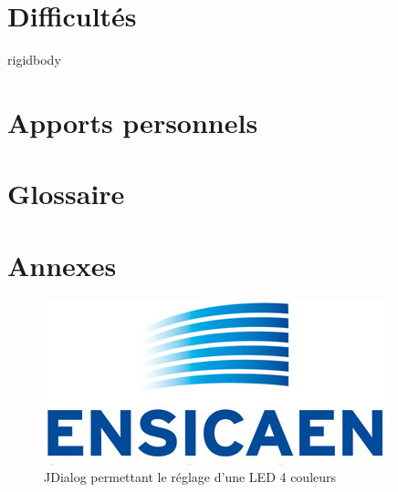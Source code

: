 \documentclass[a4paper,11pt]{myreport}
\begin{document}
\chapter{Difficultés}
rigidbody
\chapter{Apports personnels}

\chapter{Glossaire}

\chapter{Annexes}

\begin{figure}[h]
	\includegraphics[scale=0.70]{./images/LogoEnsicaenSansTexte.jpg}
	\caption{JDialog permettant le réglage d'une LED 4 couleurs}
\end{figure}
\listoffigures
\end{document}
